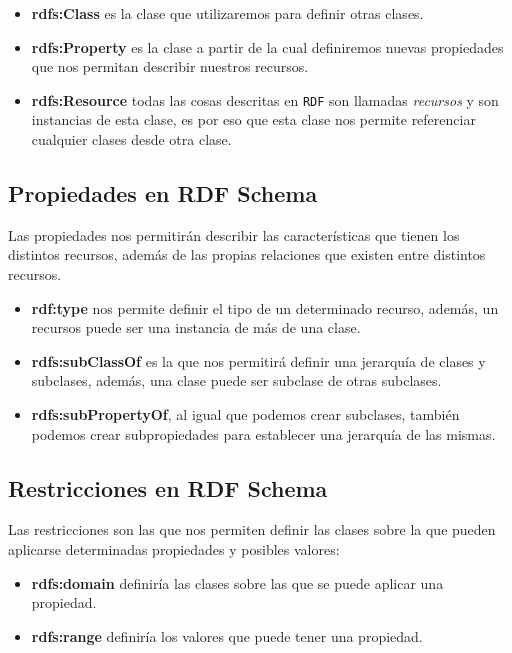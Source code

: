 	\begin{itemize}
		\item \textbf{rdfs:Class} es la clase que utilizaremos para definir otras clases.
		\item \textbf{rdfs:Property} es la clase a partir de la cual definiremos nuevas propiedades que nos permitan describir nuestros recursos.
		\item \textbf{rdfs:Resource} todas las cosas descritas en {\tt RDF} son llamadas \textit{recursos} y son instancias de esta clase, es por eso que esta clase nos permite referenciar cualquier clases desde otra clase.
	\end{itemize}

\subsection{Propiedades en RDF Schema}
Las propiedades nos permitirán describir las características que tienen los distintos recursos, además de las propias relaciones que existen entre distintos recursos.

	\begin{itemize}
		\item \textbf{rdf:type} nos permite definir el tipo de un determinado recurso, además, un recursos puede ser una instancia de más de una clase.
		\item \textbf{rdfs:subClassOf} es la que nos permitirá definir una jerarquía de clases y subclases, además, una clase puede ser subclase de otras subclases.
		\item \textbf{rdfs:subPropertyOf}, al igual que podemos crear subclases, también podemos crear subpropiedades para establecer una jerarquía de las mismas.
	\end{itemize}

\subsection{Restricciones en RDF Schema}	

Las restricciones son las que nos permiten definir las clases sobre la que pueden aplicarse determinadas propiedades y posibles valores:

	\begin{itemize}
		\item \textbf{rdfs:domain} definiría las clases sobre las que se puede aplicar una propiedad.
		\item \textbf{rdfs:range} definiría los valores que puede tener una propiedad.
	\end{itemize}

